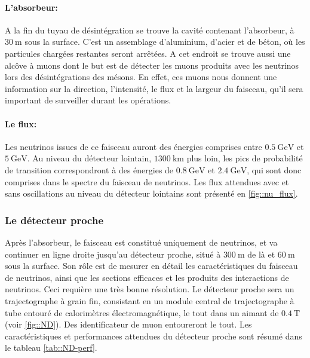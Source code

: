 	         \paragraph{L'absorbeur:} A la fin du tuyau de désintégration se trouve la cavité contenant l'absorbeur, à $\SI{30}{\meter}$ sous la surface. C'est un assemblage d'aluminium, d'acier et de béton, où les particules chargées restantes seront arrêtées. A cet endroit se trouve aussi une alcôve à muons dont le but est de détecter les muons produits avec les neutrinos lors des désintégrations des mésons. En effet, ces muons nous donnent une information sur la direction, l'intensité, le flux et la largeur du faisceau, qu'il sera important de surveiller durant les opérations.
	         
	         \paragraph{Le flux:} Les neutrinos issues de ce faisceau auront des énergies comprises entre $\SI{0.5}{\giga\electronvolt}$ et $\SI{5}{\giga\electronvolt}$. Au niveau du détecteur lointain, $\SI{1300}{\kilo\meter}$ plus loin, les pics de probabilité de transition correspondront à des énergies de $\SI{0.8}{\giga\electronvolt}$ et $\SI{2.4}{\giga\electronvolt}$, qui sont donc comprises dans le spectre du faisceau de neutrinos. Les flux attendues avec et sans oscillations au niveau du détecteur lointains sont présenté en \autoref{fig::nu_flux}.
	         
	         \subsubsection{Le détecteur proche}\label{sec::near_detector}
	         Après l'absorbeur, le faisceau est constitué uniquement de neutrinos, et va continuer en ligne droite jusqu'au détecteur proche, situé à $\SI{300}{\meter}$ de là et $\SI{60}{\meter}$ sous la surface. Son rôle est de mesurer en détail les caractéristiques du faisceau de neutrinos, ainsi que les sections efficaces et les produits des interactions de neutrinos. Ceci requière une très bonne résolution. Le détecteur proche sera un trajectographe à grain fin, consistant en un module central de trajectographe à tube entouré de calorimètres électromagnétique, le tout dans un aimant de $\SI{0.4}{\tesla}$ (voir \autoref{fig::ND}). Des identificateur de muon entoureront le tout. Les caractéristiques et performances attendues du détecteur proche sont résumé dans le tableau \ref{tab::ND-perf}.
	         
